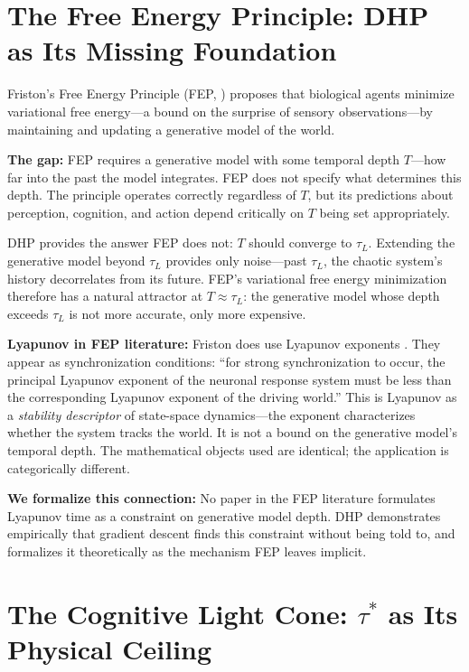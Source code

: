 \documentclass[12pt]{article}
\begin{document}
\section{The Free Energy Principle: DHP as Its Missing Foundation}
\label{sec:fep}

Friston's Free Energy Principle (FEP, \citealt{friston2010free}) proposes that biological
agents minimize variational free energy---a bound on the surprise of sensory
observations---by maintaining and updating a generative model of the world.

\textbf{The gap:} FEP requires a generative model with some temporal depth $T$---how far
into the past the model integrates. FEP does not specify what determines this depth. The
principle operates correctly regardless of $T$, but its predictions about perception,
cognition, and action depend critically on $T$ being set appropriately.

DHP provides the answer FEP does not: $T$ should converge to $\tau_L$. Extending the
generative model beyond $\tau_L$ provides only noise---past $\tau_L$, the chaotic system's
history decorrelates from its future. FEP's variational free energy minimization therefore
has a natural attractor at $T \approx \tau_L$: the generative model whose depth exceeds
$\tau_L$ is not more accurate, only more expensive.

\textbf{Lyapunov in FEP literature:} Friston does use Lyapunov exponents
\citep{friston2010free}. They appear as synchronization conditions: ``for strong
synchronization to occur, the principal Lyapunov exponent of the neuronal response system
must be less than the corresponding Lyapunov exponent of the driving world.'' This is
Lyapunov as a \emph{stability descriptor} of state-space dynamics---the exponent
characterizes whether the system tracks the world. It is not a bound on the generative
model's temporal depth. The mathematical objects used are identical; the application is
categorically different.

\textbf{We formalize this connection:} No paper in the FEP literature formulates Lyapunov
time as a constraint on generative model depth. DHP demonstrates empirically that gradient
descent finds this constraint without being told to, and formalizes it theoretically as the
mechanism FEP leaves implicit.

\section{The Cognitive Light Cone: $\tau^*$ as Its Physical Ceiling}
\label{sec:lightcone}
\end{document}
